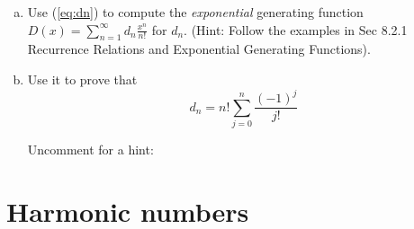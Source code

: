 \documentclass[12pt]{amsart}
\begin{document}
\begin{enumerate}[a.]
\item
Use (\ref{eq:dn}) to compute the \emph{exponential} generating function $D(x)=\sum_{n=1}^\infty d_n \frac{x^n}{n!}$ for $d_n$. (Hint: Follow the examples in Sec 8.2.1 Recurrence Relations and Exponential Generating Functions).

\item
Use it to prove that  
\[
d_n = n! \sum_{j=0}^n \frac{(-1)^j}{j!}
\]

{\tiny  \noindent Uncomment for a hint:}



\end{enumerate}

\section{%
Harmonic numbers}
\end{document}
